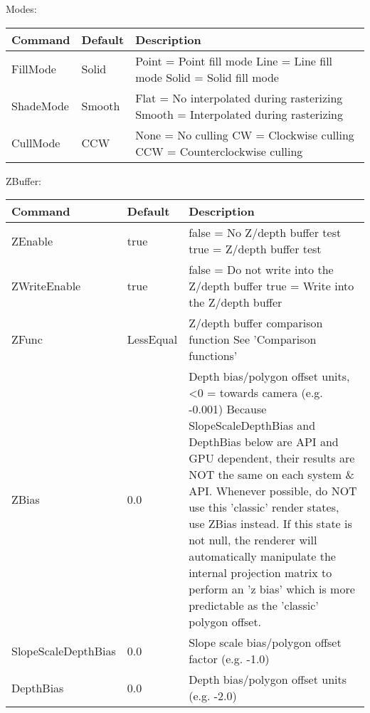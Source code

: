 Modes:\\
\begin{tabular}{|p{4.5cm}|p{3cm}|p{9cm}|}
\hline
\textbf{Command} & \textbf{Default} & \textbf{Description}\\
\hline
FillMode  & Solid  & Point = Point fill mode\newline
                     Line  = Line fill mode\newline
                     Solid = Solid fill mode\\
\hline
ShadeMode & Smooth & Flat   = No interpolated during rasterizing\newline
                     Smooth = Interpolated during rasterizing\\
\hline
CullMode  & CCW    & None = No culling\newline
                     CW	  = Clockwise culling\newline
                     CCW  = Counterclockwise culling\\
\hline
\end{tabular}


ZBuffer:\\
\begin{tabular}{|p{4.5cm}|p{3cm}|p{9cm}|}
\hline
\textbf{Command} & \textbf{Default} & \textbf{Description}\\
\hline
ZEnable              & true      & false = No Z/depth buffer test\newline
                                   true  = Z/depth buffer test\\
\hline
ZWriteEnable         & true      & false = Do not write into the Z/depth buffer\newline
                                   true  = Write into the Z/depth buffer\\
\hline
ZFunc                & LessEqual & Z/depth buffer comparison function\newline
                                   See 'Comparison functions'\\
\hline
ZBias                & 0.0       & Depth bias/polygon offset units, <0 = towards camera (e.g. -0.001)\newline
                                   Because SlopeScaleDepthBias and DepthBias below are API and 
                                   GPU dependent, their results are NOT the same on each system \& API. Whenever possible, do NOT use 
                                   this 'classic' render states, use ZBias instead. If this state is not null, the renderer 
                                   will automatically manipulate the internal projection matrix to perform an 'z bias' which is more 
                                   predictable as the 'classic' polygon offset.\\
\hline
SlopeScaleDepthBias  & 0.0       & Slope scale bias/polygon offset factor (e.g. -1.0)\\
\hline
DepthBias            & 0.0       & Depth bias/polygon offset units (e.g. -2.0)\\
\hline
\end{tabular}

